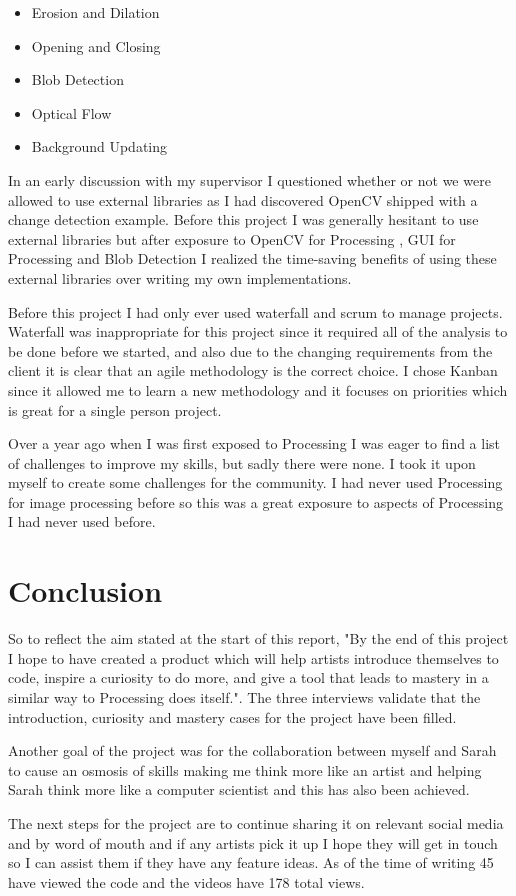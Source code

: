 \documentclass[a4paper]{report}
\begin{document}
\begin{itemize}
\item Erosion and Dilation
\item Opening and Closing
\item Blob Detection
\item Optical Flow
\item Background Updating
\end{itemize}

In an early discussion with my supervisor I questioned whether or not we were allowed to use external libraries as I had discovered OpenCV shipped with a change detection example. Before this project I was generally hesitant to use external libraries but after exposure to OpenCV for Processing \cite{PROCESSING}, GUI for Processing \cite{G4P} and Blob Detection \cite{BLOB} I realized the time-saving benefits of using these external libraries over writing my own implementations.

Before this project I had only ever used waterfall and scrum to manage projects. Waterfall was inappropriate for this project since it required all of the analysis to be done before we started, and also due to the changing requirements from the client it is clear that an agile methodology is the correct choice. I chose Kanban since it allowed me to learn a new methodology and it focuses on priorities which is great for a single person project.

Over a year ago when I was first exposed to Processing I was eager to find a list of challenges to improve my skills, but sadly there were none. I took it upon myself to create some challenges for the community. I had never used Processing for image processing before so this was a great exposure to aspects of Processing I had never used before.

\section{Conclusion}
So to reflect the aim stated at the start of this report,
"By the end of this project I hope to have created a product which will help artists introduce themselves to code, inspire a curiosity to do more, and give a tool that leads to mastery in a similar way to Processing\cite{PROCESSING} does itself.". The three interviews validate that the introduction, curiosity and mastery cases for the project have been filled.

Another goal of the project was for the collaboration between myself and Sarah to cause an osmosis of skills making me think more like an artist and helping Sarah think more like a computer scientist and this has also been achieved. 

The next steps for the project are to continue sharing it on relevant social media and by word of mouth and if any artists pick it up I hope they will get in touch so I can assist them if they have any feature ideas. As of the time of writing 45 have viewed the code and the videos have 178 total views.


\end{document}

